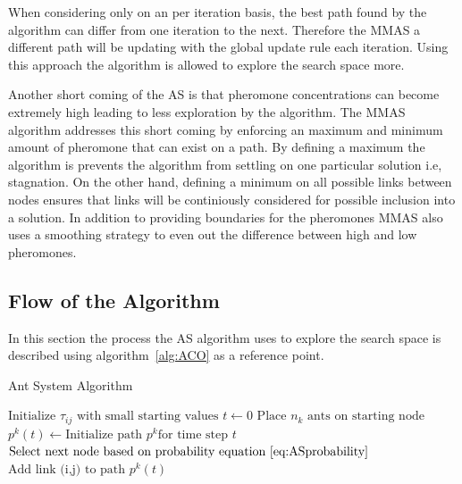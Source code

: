 When considering only on an per iteration basis, the best path found by the algorithm can differ from one iteration to the next\cite{FundamentalSwarm}. Therefore the \gls{MMAS} a different path will be updating with the global update rule each iteration\cite{FundamentalSwarm}. Using this approach the algorithm is allowed to explore the search space more\cite{FundamentalSwarm}.

Another short coming of the \gls{AS} is that pheromone concentrations can become extremely high leading to less exploration by the algorithm\cite{FundamentalSwarm}. The \gls{MMAS} algorithm addresses this short coming by enforcing an maximum and minimum amount of pheromone that can exist on a path\cite{FundamentalSwarm}. By defining a maximum the algorithm is prevents the algorithm from settling on one particular solution i.e, stagnation\cite{FundamentalSwarm}. On the other hand, defining a minimum on all possible links between nodes ensures that links will be continiously considered for possible inclusion into a solution\cite{FundamentalSwarm}. In addition to providing boundaries for the pheromones \gls{MMAS} also uses a smoothing strategy to even out the difference between high and low pheromones\cite{FundamentalSwarm}.

\subsection{Flow of the Algorithm}
In this section the process the \gls{AS} algorithm uses to explore the search space is described using algorithm~\ref{alg:ACO} as a reference point.
\begin{algorithm}[H]
\caption{Ant System Algorithm~\cite{CompuIntelligenceIntro}}
\label{alg:ACO}
	\begin{algorithmic}[1]
	\State$\text{Initialize $\tau_{ij}$ with small starting values}$
	\State$t \leftarrow 0$
	\State$\text{Place $n_k$ ants on starting node}$
			\State$p^k(t) \leftarrow \text{Initialize path } p^k \text{for time step } t$
			\Repeat
				\State$\text{Select next node based on probability equation~\ref{eq:ASprobability}}$
				\State$\text{Add link (i,j) to path } p^k(t)$
	\end{algorithmic}
\end{algorithm}

